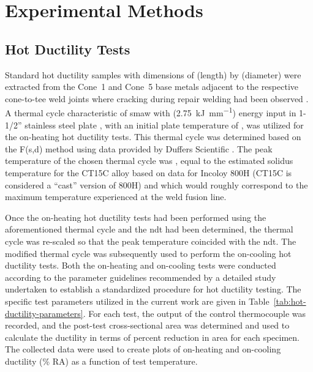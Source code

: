\chapter{Experimental Methods} \label{ch:experimental-methods}

\section{Hot Ductility Tests}
Standard hot ductility samples with dimensions of  (length) by  (diameter) were extracted from the Cone~1 and Cone~5 base metals adjacent to the respective cone-to-tee weld joints where cracking during repair welding had been observed \cite{hoffman_weld_1998}.  A thermal cycle characteristic of \gls{smaw} with  (\SI[round-mode=places,round-precision=2]{2.75}{\kilo\joule\per\milli\meter}) energy input in 1-1/2” stainless steel plate \cite{nippes_heat-affected_1955}, with an initial plate temperature of , was utilized for the on-heating hot ductility tests.  This thermal cycle was determined based on the F(s,d) method \cite{nippes_cooling_1949} using data provided by Duffers Scientific \cite{duffers_haz_1989}. The peak temperature of the chosen thermal cycle was , equal to the estimated solidus temperature for the CT15C alloy based on data for Incoloy 800H (CT15C is considered a ``cast'' version of 800H) and which would roughly correspond to the maximum temperature experienced at the weld fusion line.

Once the on-heating hot ductility tests had been performed using the aforementioned thermal cycle and the \gls{ndt} had been determined, the thermal cycle was re-scaled so that the peak temperature coincided with the \gls{ndt}. The modified thermal cycle was subsequently used to perform the on-cooling hot ductility tests.  Both the on-heating and on-cooling tests were conducted according to the parameter guidelines recommended by a detailed study \cite{lundin_standardization_1990_experiment} undertaken to establish a standardized procedure for hot ductility testing.  The specific test parameters utilized in the current work are given in Table~\ref{tab:hot-ductility-parameters}.  For each test, the output of the control thermocouple was recorded, and the post-test cross-sectional area was determined and used to calculate the ductility in terms of percent reduction in area for each specimen.  The collected data were used to create plots of on-heating and on-cooling ductility (\% RA) as a function of test temperature.

